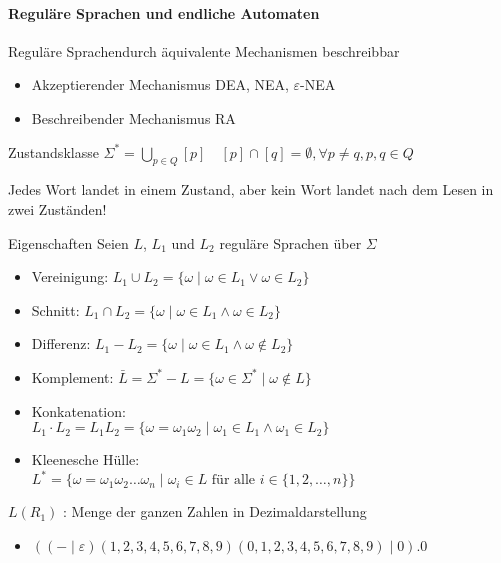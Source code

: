 \graphicspath{{images/}}

\paragraph{Reguläre Sprachen und endliche Automaten}

\begin{concept}{Reguläre Sprachen}durch äquivalente Mechanismen beschreibbar
    \begin{itemize}
        \item Akzeptierender Mechanismus
         DEA, NEA, $\varepsilon$-NEA
        \item Beschreibender Mechanismus RA
    \end{itemize}
\end{concept}

\begin{definition}{Zustandsklasse}
    $\Sigma^{*}=\bigcup_{p \in Q}[p] \quad [p] \cap[q]=\emptyset, \forall p \neq q, p, q \in Q$

    Jedes Wort landet in einem Zustand, aber kein Wort landet nach dem Lesen in zwei Zuständen!
\end{definition}

\begin{theorem}{Eigenschaften}
    Seien $L$, $L_{1}$ und $L_{2}$ reguläre Sprachen über $\Sigma$
    \begin{itemize}
        \item Vereinigung: $L_{1} \cup L_{2}=\{\omega \mid \omega \in L_{1} \vee \omega \in L_{2}\}$
        \item Schnitt: $L_{1} \cap L_{2}=\{\omega \mid \omega \in L_{1} \wedge \omega \in L_{2}\}$
        \item Differenz: $L_{1}-L_{2}=\{\omega \mid \omega \in L_{1} \wedge \omega \notin L_{2}\}$
        \item Komplement: $\bar{L}=\Sigma^{*}-L=\{\omega \in \Sigma^{*} \mid \omega \notin L\}$
        \item Konkatenation:\\
        $L_{1} \cdot L_{2}= L_{1} L_{2} = \{\omega=\omega_{1} \omega_{2} \mid \omega_{1} \in L_{1} \wedge \omega_{1} \in L_{2}\}$
        \item Kleenesche Hülle:\\
        $L^{*}=\{\omega=\omega_{1} \omega_{2} \ldots \omega_{n} \mid \omega_{i} \in L \text { für alle } i \in\{1,2, \ldots, n\}\}$
    \end{itemize}
\end{theorem}

\begin{remark}
    $L\left(R_{1}\right)$ : Menge der ganzen Zahlen in Dezimaldarstellung
    \begin{itemize}
    \item $((-\mid \varepsilon)(1,2,3,4,5,6,7,8,9)(0,1,2,3,4,5,6,7,8,9) \mid 0) .0$
    \end{itemize}
\end{remark}

